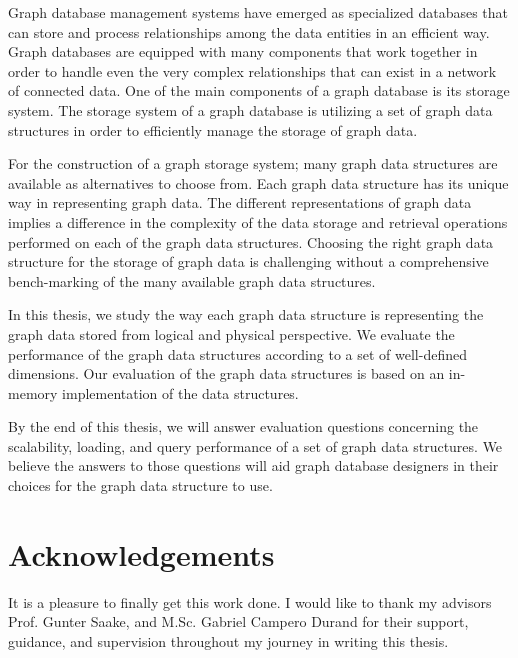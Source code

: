 
Graph database management systems have emerged as specialized databases that can store and process relationships among the data entities in an efficient way. Graph databases are equipped with many components that work together in order to handle even the very complex relationships that can exist in a network of connected data. One of the main components of a graph database is its storage system. The storage system of a graph database is utilizing a set of graph data structures in order to efficiently manage the storage of graph data. 

For the construction of a graph storage system; many graph data structures are available as alternatives to choose from. Each graph data structure has its unique way in representing graph data. The different representations of graph data implies a difference in the complexity of the data storage and retrieval operations performed on each of the graph data structures. Choosing the right graph data structure for the storage of graph data is challenging without a comprehensive bench-marking of the many available graph data structures.

In this thesis, we study the way each graph data structure is representing the graph data stored from logical and physical perspective. We evaluate the performance of the graph data structures according to a set of well-defined dimensions. Our evaluation of the graph data structures is based on an in-memory implementation of the data structures. 

By the end of this thesis, we will answer evaluation questions concerning the scalability, loading, and query performance of a set of graph data structures. We believe the answers to those questions will aid graph database designers in their choices for the graph data structure to use.

{\chapter*{Acknowledgements}}

It is a pleasure to finally get this work done. I would like to thank my advisors Prof. Gunter Saake, and M.Sc. Gabriel Campero Durand for their support, guidance, and supervision throughout my journey in writing this thesis. 

